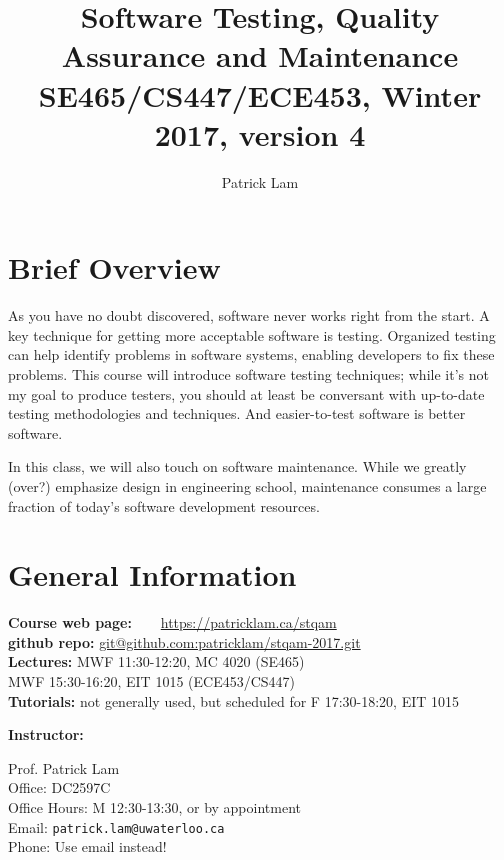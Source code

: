 \documentclass{article}
\begin{document}
\title{Software Testing, Quality Assurance and Maintenance\\SE465/CS447/ECE453, Winter 2017, version 4}
\author{Patrick Lam}
\renewcommand{\today}{}
\maketitle
\vspace*{-2em}

\section*{Brief Overview}
As you have no doubt discovered, software never works right from the
start. A key technique for getting more acceptable software is
testing. Organized testing can help identify problems in software
systems, enabling developers to fix these problems.  This course will
introduce software testing techniques; while it's not my goal
to produce testers, you should at least be conversant
with up-to-date testing methodologies and techniques. And easier-to-test
software is better software.

In this class, we will also touch on software maintenance. While we
greatly (over?) emphasize design in engineering school, maintenance
consumes a large fraction of today's software development resources.

\section*{General Information}

\noindent
\begin{tabbing}
  {\bf Course web page:~~~} \= \url{https://patricklam.ca/stqam}\\
  {\bf github repo:}\> \url{git@github.com:patricklam/stqam-2017.git}\\
  {\bf Lectures:} \> MWF 11:30-12:20, MC 4020 (SE465)\\
\> MWF 15:30-16:20, EIT 1015 (ECE453/CS447)\\
{\bf Tutorials:} \> not generally used, but scheduled for F 17:30-18:20, EIT 1015
\end{tabbing}

\noindent
{\bf Instructor:} \\

\noindent
\hspace*{2em} \begin{minipage}{.6\textwidth}
Prof. Patrick Lam\\
Office: DC2597C\\
Office Hours: M 12:30-13:30, or by appointment\\
Email: {\tt patrick.lam@uwaterloo.ca}\\
Phone: Use email instead!

\end{minipage} \\[1em]
\end{document}
